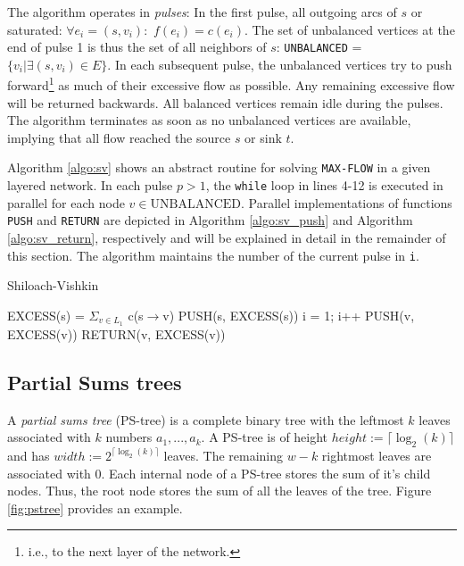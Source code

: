 \documentclass[a4paper,10pt, twocolumn]{article}
\begin{document}
The algorithm operates in \emph{pulses}: In the first pulse, all outgoing arcs of $s$ or saturated: $\forall e_i = (s, v_i):$ $f(e_i) = c(e_i)$. The set of unbalanced vertices at the end of pulse 1 is thus the set of all neighbors of $s$: \lstinline|UNBALANCED| = $\{v_i\lvert \exists (s, v_i) \in E \}$. In each subsequent pulse, the unbalanced vertices try to push forward\footnote{i.e., to the next layer of the network.} as much of their excessive flow as possible. Any remaining excessive flow will be returned backwards. All balanced vertices remain idle during the pulses. The algorithm terminates as soon as no unbalanced vertices are available, implying that all flow reached the source $s$ or sink $t$.

Algorithm \ref{algo:sv} shows an abstract routine for solving \lstinline|MAX-FLOW| in a given layered network. In each pulse $p>1$, the \lstinline|while| loop in lines 4-12 is executed in parallel for each node $v \in \mathrm{UNBALANCED}$. Parallel implementations of functions \lstinline|PUSH| and \lstinline|RETURN| are depicted in Algorithm \ref{algo:sv_push} and Algorithm \ref{algo:sv_return}, respectively and will be explained in detail in the remainder of this section. The algorithm maintains the number of the current pulse in \texttt{i}.

\begin{algorithm}
\caption{Shiloach-Vishkin}
\label{algo:sv}
\begin{algorithmic}[1]
		\State EXCESS(s) = $\Sigma_{v \in L_1}$ c(s$\rightarrow$v)
		\State PUSH(s, EXCESS(s))
		i = 1;
			\State i++
					\State PUSH(v, EXCESS(v))
				\EndIf
			\EndFor
			\State RETURN(v, EXCESS(v))
		\EndWhile
	\EndFunction
\end{algorithmic}
\end{algorithm}

\subsection{Partial Sums trees}
\label{sec:sv_pstrees}
A \emph{partial sums tree} (PS-tree) is a complete binary tree with the leftmost $k$ leaves associated with $k$ numbers $a_1,...,a_k$. A PS-tree is of height $height := \lceil \log_2(k) \rceil$ and has $width := 2^{\lceil \log_2(k) \rceil}$ leaves. The remaining $w - k$ rightmost leaves are associated with 0. Each internal node of a PS-tree stores the sum of it's child nodes. Thus, the root node stores the sum of all the leaves of the tree. Figure \ref{fig:pstree} provides an example.
\end{document}
